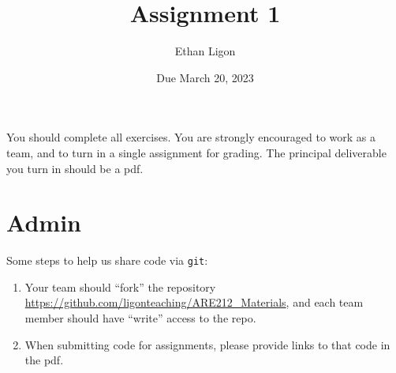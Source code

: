 \documentclass[12pt]{amsart}
\author{Ethan Ligon}
\date{Due March 20, 2023}
\title{Assignment 1}
\begin{document}
\maketitle
You should complete all exercises.   You are strongly encouraged to work as a  team, and to turn in a single assignment for grading.   The principal deliverable you turn in should be a pdf.
\section{Admin}
\label{sec:org6d0dc06}
Some steps to help us share code via \texttt{git}:
\begin{enumerate}
\item Your team should ``fork'' the repository \url{https://github.com/ligonteaching/ARE212\_Materials}, and each  team member should have ``write'' access to the repo.
\item When submitting code for assignments, please provide links to that code in the pdf.
\end{enumerate}
\end{document}
